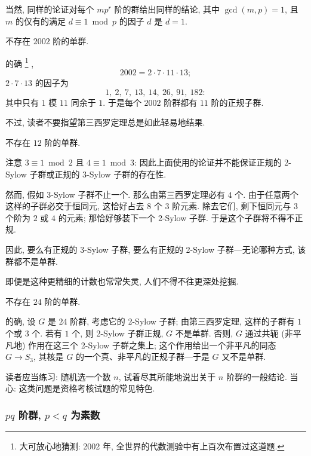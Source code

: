 当然, 同样的论证对每个 $mp^r$ 阶的群给出同样的结论, 其中 $\gcd(m,p) = 1$, 且 $m$ 的仅有的满足 $d \equiv 1 \bmod p$ 的因子 $d$ 是 $d = 1$.

\begin{example}
\label{ex:2002}
不存在 $2002$ 阶的单群.

的确%
\footnote{大可放心地猜测: 2002 年, 全世界的代数测验中有上百次布置过这道题.}%
,
\[
2002 = 2 \cdot 7 \cdot 11 \cdot 13;
\]
$2 \cdot 7 \cdot 13$ 的因子为
\[
1,\ 2,\ 7,\ 13,\ 14,\ 26,\ 91,\ 182:
\]
其中只有 $1$ 模 $11$ 同余于 $1$. 于是每个 $2002$ 阶群都有 $11$ 阶的正规子群.
\end{example}

不过, 读者不要指望第三西罗定理总是如此轻易地结果.

\begin{example}
\label{ex:order-12}
不存在 $12$ 阶的单群.

注意 $3 \equiv 1 \bmod 2$ 且 $4 \equiv 1 \bmod 3$: 因此上面使用的论证并不能保证正规的 2-Sylow 子群或正规的 3-Sylow 子群的存在性.

然而, 假如 3-Sylow 子群不止一个. 那么由第三西罗定理必有 $4$ 个. 由于任意两个这样的子群必交于恒同元, 这恰好占去 $8$ 个 $3$ 阶元素. 除去它们, 剩下恒同元与 $3$ 个阶为 $2$ 或 $4$ 的元素; 那恰好够装下一个 2-Sylow 子群. 于是这个子群将不得不正规.

因此, 要么有正规的 3-Sylow 子群, 要么有正规的 2-Sylow 子群---无论哪种方式, 该群都不是单群.
\end{example}

即便是这种更精细的计数也常常失灵, 人们不得不往更深处挖掘.

\begin{example}
\label{ex:order-24}
不存在 $24$ 阶的单群.

的确, 设 $G$ 是 $24$ 阶群, 考虑它的 2-Sylow 子群; 由第三西罗定理, 这样的子群有 $1$ 个或 $3$ 个. 若有 $1$ 个, 则 2-Sylow 子群正规, $G$ 不是单群. 否则, $G$ 通过共轭 (非平凡地) 作用在这三个 2-Sylow 子群之集上; 这个作用给出一个非平凡的同态 $G \rightarrow S_3$, 其核是 $G$ 的一个真、非平凡的正规子群---于是 $G$ 又不是单群.
\end{example}

读者应当练习: 随机选一个数 $n$, 试着尽其所能地说出关于 $n$ 阶群的一般结论. 当心: 这类问题是资格考核试题的常见特色.

\subsubsection{\texorpdfstring{$pq$ 阶群, $p < q$ 为素数}{pq 阶群, p < q 为素数}}
\leavevmode{}\makeatletter{}\makeatother\label{subsec:pq-groups}

